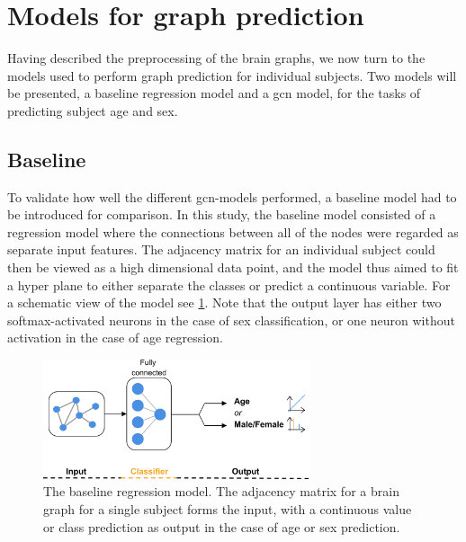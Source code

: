 \section{Models for graph prediction}

Having described the preprocessing of the brain graphs, we now turn to the models used to perform graph prediction for individual subjects. Two models will be presented, a baseline regression model and a \acrshort{gcn} model, for the tasks of predicting subject age and sex.

\subsection{Baseline}
To validate how well the different \acrshort{gcn}-models performed, a baseline model had to be introduced for comparison. In this study, the baseline model consisted of a regression model where the connections between all of the nodes were regarded as separate input features. The adjacency matrix for an individual subject could then be viewed as a high dimensional data point, and the model thus aimed to fit a hyper plane to either separate the classes or predict a continuous variable. For a schematic view of the model see \cref{fig:Graph_class_baseline}. Note that the output layer has either two softmax-activated neurons in the case of sex classification, or one neuron without activation in the case of age regression. 


\begin{figure}[!htbp]
    \centering
    \includegraphics[width=0.7\textwidth]{chapters/images_methods/ffnn_v2.png}
    \caption{The baseline regression model. The adjacency matrix for a brain graph for a single subject forms the input, with a continuous value or class prediction as output in the case of age or sex prediction.}
    \label{fig:Graph_class_baseline}
\end{figure}



